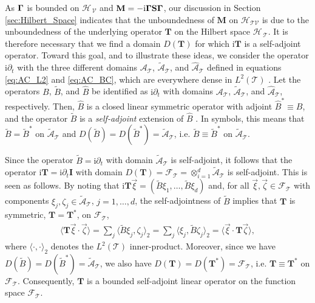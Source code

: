 \documentclass[11pt]{amsart}
\newcommand{\I}{\mathrm{i}}
\newcommand{\Mb}{\mathbf{M}}
\newcommand{\Tb}{\mathbf{T}}
\newcommand{\Ib}{\mathbf{I}}
\newcommand{\Sb}{\mathbf{S}}
\newcommand{\Tc}{\mathcal{T}}
\newcommand{\Vc}{\mathcal{V}}
\newcommand{\Hs}{\mathscr{H}}
\newcommand{\As}{\mathscr{A}}
\newcommand{\Fs}{\mathscr{F}}
\newcommand\bGamma{\mbox{\boldmath${\Gamma}$}}
\begin{document}
As $\bGamma$ is bounded on $\Hs_{\,\Vc}$ and
$\Mb=-\I\bGamma\Sb\bGamma$, our discussion in Section
\ref{sec:Hilbert_Space} indicates that the unboundedness of $\Mb$ on
$\Hs_{\Tc\Vc}$ is due to the unboundedness of the underlying operator
$\Tb$ on the Hilbert space $\Hs_{\,\Tc}$. It is therefore necessary
that we find a domain $D(\Tb)$ for which $\I\Tb$ is a self-adjoint
operator. Toward this goal, and to illustrate these ideas, we consider
the operator $\I\partial_t$ with the three different domains $\As_{\Tc}$,
$\tilde{\As}_{\Tc}$, and $\hat{\As}_{\Tc}$ defined in equations
\eqref{eq:AC_L2} and \eqref{eq:AC_BC}, which are everywhere dense in
$L^2(\Tc)$ \cite{Stone:64}. Let the operators $B$, $\tilde{B}$, and
$\hat{B}$ be identified as $\I\partial_t$ with domains $\As_{\Tc}$,
$\tilde{\As}_{\Tc}$, and $\hat{\As}_{\Tc}$, respectively. Then,
$\hat{B}$ is a closed linear symmetric operator with adjoint
$\hat{B}^*\equiv B$, and the operator $\tilde{B}$ is a \emph{self-adjoint}
extension of $\hat{B}$ \cite{Stone:64}. In symbols, this means that 
$\tilde{B}=\tilde{B}^*$ on $\tilde{\As}_{\Tc}$ and
$D(\tilde{B})=D(\tilde{B}^*)=\tilde{\As}_{\Tc}$,
i.e. $\tilde{B}\equiv\tilde{B}^*$ on $\tilde{\As}_{\Tc}$.     



Since the operator $\tilde{B}=\I\partial_t$ with domain $\tilde{\As}_{\Tc}$ is
self-adjoint, it follows that the operator $\I\Tb=\I\partial_t\Ib$ with domain
$D(\Tb)=\Fs_{\Tc}=\otimes_{i=1}^d\tilde{\As}_{\Tc}$ is self-adjoint. This is
seen as follows. By noting that
$\I\Tb\vec{\xi}=(\tilde{B}\xi_1,\ldots,\tilde{B}\xi_d)$ and, for all 
$\vec{\xi},\vec{\zeta}\in\Fs_{\Tc}$ with components
$\xi_j,\zeta_j\in\tilde{\As}_{\Tc}$, $j=1,\ldots,d$, the self-adjointness of 
$\tilde{B}$ implies that $\Tb$ is symmetric, $\Tb=\Tb^*$, on $\Fs_{\Tc}$, 
%
\begin{align}\label{eq:T_symmetric}
  \langle\Tb\vec{\xi}\cdot\vec{\zeta}\rangle=\sum_j\langle\tilde{B}\xi_j,\zeta_j\rangle_2
                    =\sum_j\langle\xi_j,\tilde{B}\zeta_j\rangle_2
                    =\langle\vec{\xi}\cdot\Tb\vec{\zeta}\rangle,
\end{align}
%
where $\langle\cdot,\cdot\rangle_2$ denotes the $L^2(\Tc)$ inner-product.  Moreover, since we have
$D(\tilde{B})=D(\tilde{B}^*)=\tilde{\As}_{\Tc}$, we also have
$D(\Tb)=D(\Tb^*)=\Fs_{\Tc}$, i.e. $\Tb\equiv\Tb^*$ on
$\Fs_{\Tc}$. Consequently, $\Tb$ is a bounded self-adjoint linear
operator on the function space $\Fs_{\Tc}$.
\end{document}
